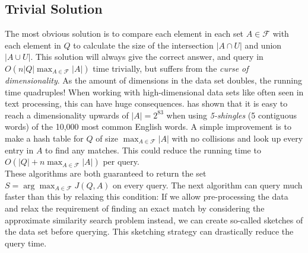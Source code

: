 \subsection{Trivial Solution}
The most obvious solution is to compare each element in each set $A\in \mathcal{F}$ with each element in $Q$ to calculate the size of the intersection $|A\cap U|$ and union $|A \cup U|$. This solution will always give the correct answer, and query in $O(n|Q|\max_{A\in \mathcal{F}}|A|)$ time trivially, but suffers from the \textit{curse of dimensionality}. As the amount of dimensions in the data set doubles, the running time quadruples! When working with high-dimensional data sets like often seen in text processing, this can have huge consequences. \citet{li2011hashing} has shown that it is easy to reach a dimensionality upwards of $|A|=2^{83}$ when using \textit{5-shingles} (5 contiguous words) of the 10,000 most common English words.
A simple improvement is to make a hash table for $Q$ of size $\max_{A\in \mathcal{F}}|A|$ with no collisions and look up every entry in $A$ to find any matches. This could reduce the running time to $O(|Q|+n\max_{A\in \mathcal{F}}|A|)$ per query.\\
These algorithms are both guaranteed to return the set $S=\arg\max_{A \in \mathcal{F}}J(Q,A)$ on every query. The next algorithm can query much faster than this by relaxing this condition: If we allow pre-processing the data and relax the requirement of finding an exact match by considering the approximate similarity search problem instead, we can create so-called sketches of the data set before querying. This sketching strategy can drastically reduce the query time.
